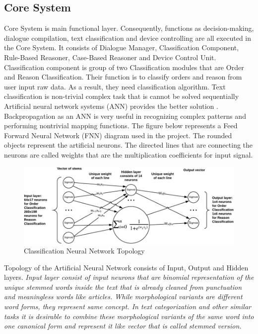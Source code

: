 \documentclass{llncs}
\begin{document}
    \subsection{Core System}
    Core System is main functional layer.
    Consequently, functions as decision-making, dialogue compilation, text classification and device controlling are all executed in the Core System.
    It consists of Dialogue Manager, Classification Component, Rule-Based Reasoner, Case-Based Reasoner and Device Control Unit.\\
    Classification component is group of two Classification modules that are Order and Reason Classification.
    Their function is to classify orders and reason from user input raw data.
    As a result, they need classification algorithm.
    Text classification is non-trivial complex task that is cannot be solved sequentially
    Artificial neural network systems (ANN) provides the better solution \cite{14}.
    Backpropagation as an ANN is very useful in recognizing complex patterns and performing nontrivial mapping functions.
    The figure below represents a Feed Forward Neural Network (FNN) diagram used in the project.
    The rounded objects represent the artificial neurons.
    The directed lines that are connecting the neurons are called weights that are the multiplication coefficients for input signal.
    \begin{figure} \centering \centering
        \includegraphics[trim=left botm right top, width=\textwidth, clip]{ANN.png}
        \caption[]{Classification Neural Network Topology}
    \end{figure}
    Topology of the Artificial Neural Network consists of Input, Output and Hidden layers.
    \em Input layer \em consist of input neurons that are binomial representation of the unique stemmed words inside the text that is already cleaned from punctuation and meaningless words like articles.
    While morphological variants are different word forms, they represent same concept.
    In text categorization and other similar tasks it is desirable to combine these morphological variants of the same word into one canonical form and represent it like vector that is called stemmed version.
\end{document}

